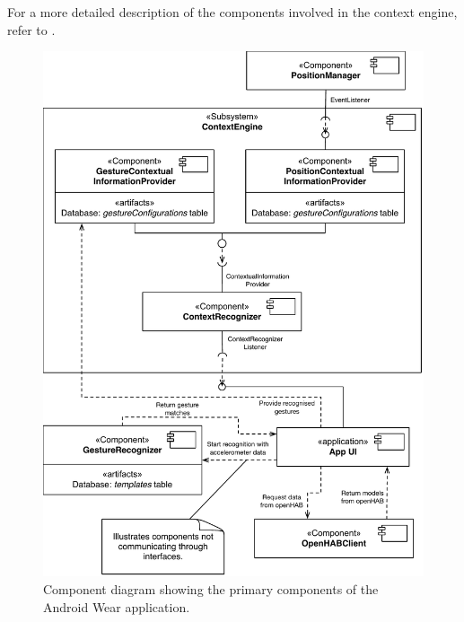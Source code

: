 For a more detailed description of the components involved in the context engine,  refer to .

\begin{figure}[h!]
\centering
\includegraphics[width=\textwidth]{images/component-diagram-wear}
\caption{Component diagram showing the primary components of the Android Wear application.}
\label{fig:implementation:component-diagram:wear}
\end{figure}

